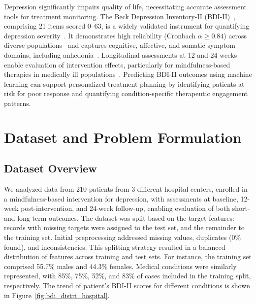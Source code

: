 \documentclass[conference]{IEEEtran}
\begin{document}

Depression significantly impairs quality of life, necessitating accurate assessment tools for treatment monitoring. The Beck Depression Inventory-II (BDI-II)~\cite{b1}, comprising 21 items scored 0–63, is a widely validated instrument for quantifying depression severity~\cite{beck1996manual}. It demonstrates high reliability (Cronbach $\alpha \geq 0.84$) across diverse populations~\cite{beck1996manual, wang2013psychometric, b4} and captures cognitive, affective, and somatic symptom domains, including anhedonia~\cite{pizzagalli2005reduced, treadway2009worth}. Longitudinal assessments at 12 and 24 weeks enable evaluation of intervention effects, particularly for mindfulness-based therapies in medically ill populations~\cite{hunot2013mindfulness, b5}. Predicting BDI-II outcomes using machine learning can support personalized treatment planning by identifying patients at risk for poor response and quantifying condition-specific therapeutic engagement patterns.

\section{Dataset and Problem Formulation}

\subsection{Dataset Overview}


We analyzed data from 210 patients from 3 different hospital centers, enrolled in a mindfulness-based intervention for depression, with assessments at baseline, 12-week post-intervention, and 24-week follow-up, enabling evaluation of both short- and long-term outcomes. The dataset was split based on the target features: records with missing targets were assigned to the test set, and the remainder to the training set. Initial preprocessing addressed missing values, duplicates (0\% found), and inconsistencies. This splitting strategy resulted in a balanced distribution of features across training and test sets. For instance, the training set comprised 55.7\% males and 44.3\% females. Medical conditions were similarly represented, with 85\%, 75\%, 52\%, and 83\% of cases included in the training split, respectively. The trend of patient's BDI-II scores for different conditions is shown in Figure~\ref{fig:bdi_distri_hospital}.
\end{document}
